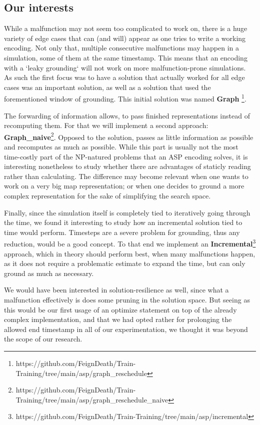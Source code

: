 \subsection{Our interests}
While a malfunction may not seem too complicated to work on, there is a huge variety of edge cases that can (and will) appear as one tries to write a working encoding. Not only that, multiple consecutive malfunctions may happen in a simulation, some of them at the same timestamp. This means that an encoding with a `leaky grounding` will not work on more malfunction-prone simulations. As such the first focus was to have a solution that actually worked for all edge cases was an important solution, as well as a solution that used the forementioned window of grounding. This initial solution was named \textbf{Graph} \footnote{https://github.com/FeignDeath/Train-Training/tree/main/asp/graph\_reschedule}. 


The forwarding of information allows, to pass finished representations instead of recomputing them. For that we will implement a second approach: \textbf{Graph\_naive}\footnote{https://github.com/FeignDeath/Train-Training/tree/main/asp/graph\_reschedule\_naive}. Opposed to the solution, passes as little information as possible and recomputes as much as possible. While this part is usually not the most time-costly part of the NP-natured problems that an ASP encoding solves, it is interesting nonetheless to study whether there are advantages of staticly reading rather than calculating. The difference may become relevant when one wants to work on a very big map representation; or when one decides to ground a more complex representation for the sake of simplifying the search space.


Finally, since the simulation itself is completely tied to iteratively going through the time, we found it interesting to study how an incremental solution tied to time would perform. Timesteps are a severe problem for grounding, thus any reduction, would be a good concept. To that end we implement an \textbf{Incremental}\footnote{https://github.com/FeignDeath/Train-Training/tree/main/asp/incremental} approach, which in theory should perform best, when many malfunctions happen, as it does not require a problematic estimate to expand the time, but can only ground as much as necessary.


We would have been interested in solution-resilience as well, since what a malfunction effectively is does some pruning in the solution space. But seeing as this would be our first usage of an optimize statement on top of the already complex implementation, and that we had opted rather for prolonging the allowed end timestamp in all of our experimentation, we thought it was beyond the scope of our research.



